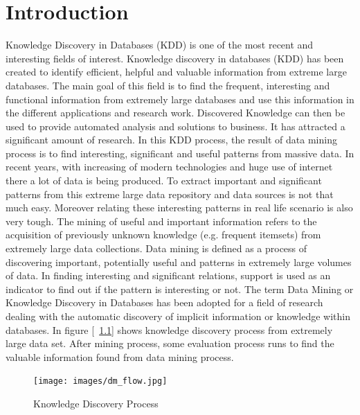 %
\chapter{Introduction}
Knowledge Discovery in Databases (KDD) is one of the most recent and interesting fields of interest. Knowledge discovery in databases (KDD) has been created to identify efficient, helpful and valuable information from extreme large databases. The main goal of this field is to find the frequent, interesting and functional information from extremely large databases and use this information in the different applications and research work. Discovered Knowledge can then be used to provide automated analysis and solutions to business. It has attracted a significant amount of research. In this KDD process, the result of data mining process is to find interesting, significant and useful patterns from massive data. In recent years, with increasing of modern technologies and huge use of internet there a lot of data is being produced. To extract important and significant patterns from this extreme large data repository and data sources is not that much easy. Moreover relating these interesting patterns in real life scenario is also very tough. The mining of useful and important information refers to the acquisition of previously unknown knowledge (e.g. frequent itemsets) from extremely large data collections. Data mining is defined as a process of discovering important, potentially useful and patterns in extremely large volumes of data. In finding interesting and significant relations, support is used as an indicator to find out if the pattern is interesting or not. The term Data Mining or Knowledge Discovery in Databases has been adopted for a field of research dealing with the automatic discovery of implicit information or knowledge within databases. In figure [~\ref{figure:dm_flow}] shows knowledge discovery process from extremely large data set. After mining process, some evaluation process runs to find the valuable information found from data mining process.\\
\begin{figure}
\centering
  \texttt{[image: images/dm\_flow.jpg]}
\caption{Knowledge Discovery Process}
\label{figure:dm_flow}
\end{figure}

